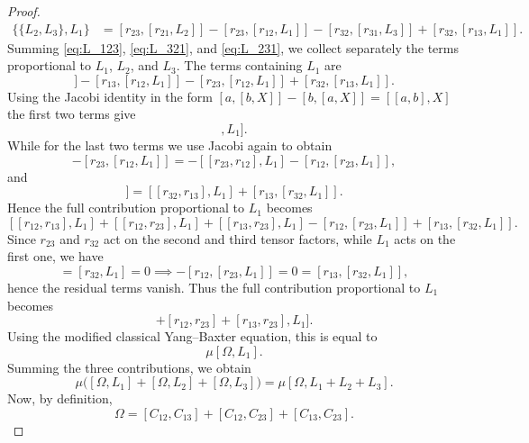 \begin{proof}
\begin{align}
        \{ \{L_2, L_3 \}, L_1 \} &= [r_{23}, [r_{21}, L_2]] - [r_{23}, [r_{12}, L_1]] - [r_{32}, [r_{31}, L_3]] + [r_{32}, [r_{13}, L_1]] \label{eq:L_231}.
    \end{align}
    Summing \eqref{eq:L_123}, \eqref{eq:L_321}, and \eqref{eq:L_231}, we collect separately the terms proportional to $L_1$, $L_2$, and $L_3$.
    The terms containing $L_1$ are
    \begin{equation}
        [r_{12},[r_{13},L_1]] - [r_{13},[r_{12},L_1]] - [r_{23},[r_{12},L_1]] + [r_{32},[r_{13},L_1]].
    \end{equation}
    Using the Jacobi identity in the form $[a,[b,X]] - [b,[a,X]] = [[a,b],X]$  the first two terms give
    \begin{equation}
        [[r_{12},r_{13}],L_1].
    \end{equation}
    While for the last two terms we use Jacobi again to obtain
    \begin{equation}
        - [r_{23},[r_{12},L_1]] =
        - [[r_{23},r_{12}],L_1] - [r_{12},[r_{23},L_1]],
    \end{equation}
    and
    \begin{equation}
        [r_{32},[r_{13},L_1]] =
        [[r_{32},r_{13}],L_1] + [r_{13},[r_{32},L_1]].
    \end{equation}
    Hence the full contribution proportional to $L_1$ becomes
    \begin{equation} \label{eq:full_L1}
     [[r_{12},r_{13}],L_1] + [[r_{12},r_{23}],L_1] + [[r_{13},r_{23}],L_1] - [r_{12},[r_{23},L_1]] + [r_{13},[r_{32},L_1]].
    \end{equation}
    Since $r_{23}$ and $r_{32}$ act on the second and third tensor factors, while $L_1$ acts on the first one, we have
    \begin{equation}
        [r_{23},L_1] = [r_{32},L_1] = 0 \implies - [r_{12},[r_{23},L_1]] = 0 = [r_{13},[r_{32},L_1]],
    \end{equation}
    hence the residual terms vanish.
    Thus the full contribution proportional to $L_1$ becomes
    \begin{equation}
        [[r_{12},r_{13}] + [r_{12},r_{23}] + [r_{13},r_{23}], L_1].
    \end{equation}
    Using the modified classical Yang--Baxter equation, this is equal to
    \begin{equation}
        \mu [\Omega, L_1].
    \end{equation}
    Summing the three contributions, we obtain
    \begin{equation}
        \mu \Big( [\Omega,L_1] + [\Omega,L_2] + [\Omega,L_3] \Big)
        = \mu [\Omega, L_1 + L_2 + L_3].
    \end{equation}
    Now, by definition,
    \begin{equation}
        \Omega = [C_{12},C_{13}] + [C_{12},C_{23}] + [C_{13},C_{23}].
    \end{equation}
    

\end{proof}
